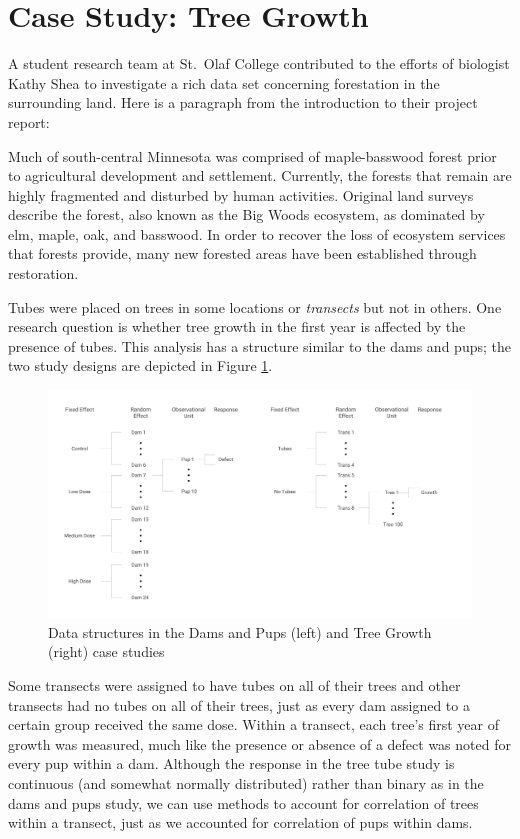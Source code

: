 \documentclass[
]{krantz}
\renewenvironment{quote}{\begin{VF}}{\end{VF}}
\begin{document}
\hypertarget{case-study-tree-growth}{%
\section{Case Study: Tree Growth}\label{case-study-tree-growth}}

A student research team at St.~Olaf College contributed to the efforts of biologist Kathy Shea to investigate a rich data set concerning forestation in the surrounding land. \citep{Eisinger2011} Here is a paragraph from the introduction to their project report:

\begin{quote}
Much of south-central Minnesota was comprised of maple-basswood forest prior to agricultural development and settlement. Currently, the forests that remain are highly fragmented and disturbed by human activities. Original land surveys describe the forest, also known as the Big Woods ecosystem, as dominated by elm, maple, oak, and basswood. In order to recover the loss of ecosystem services that forests provide, many new forested areas have been established through restoration.
\end{quote}

Tubes were placed on trees in some locations or \emph{transects} but not in others. One research question is whether tree growth in the first year is affected by the presence of tubes. This analysis has a structure similar to the dams and pups; the two study designs are depicted in Figure \ref{fig:DamsTreesStructure}.

\begin{figure}
\includegraphics[width=0.8\linewidth]{data/DamsTreesStructure} \caption{Data structures in the Dams and Pups (left) and Tree Growth (right) case studies}\label{fig:DamsTreesStructure}
\end{figure}

Some transects were assigned to have tubes on all of their trees and other transects had no tubes on all of their trees, just as every dam assigned to a certain group received the same dose. Within a transect, each tree's first year of growth was measured, much like the presence or absence of a defect was noted for every pup within a dam. Although the response in the tree tube study is continuous (and somewhat normally distributed) rather than binary as in the dams and pups study, we can use methods to account for correlation of trees within a transect, just as we accounted for correlation of pups within dams.
\end{document}
